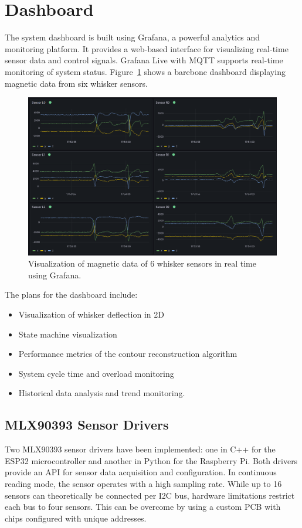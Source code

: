 \section{Dashboard}
The system dashboard is built using Grafana, a powerful analytics and monitoring platform.
It provides a web-based interface for visualizing real-time sensor data and control signals.
Grafana Live with MQTT supports real-time monitoring of system status.
Figure~\ref{fig:grafana} shows a barebone dashboard displaying magnetic data from six whisker sensors.


\begin{figure}[htb]
    \centering
    \includegraphics[width=\textwidth]{figures/grafana}
    \caption{Visualization of magnetic data of 6 whisker sensors in real time using Grafana.}
    \label{fig:grafana}
\end{figure}

The plans for the dashboard include:
\begin{itemize}
    \item Visualization of whisker deflection in 2D
    \item State machine visualization
    \item Performance metrics of the contour reconstruction algorithm
    \item System cycle time and overload monitoring
    \item Historical data analysis and trend monitoring.
\end{itemize}

\subsection{MLX90393 Sensor Drivers}
Two MLX90393 sensor drivers have been implemented: one in C++ for the ESP32 microcontroller and another in Python for the Raspberry Pi.
Both drivers provide an API for sensor data acquisition and configuration.
In continuous reading mode, the sensor operates with a high sampling rate.
While up to 16 sensors can theoretically be connected per I2C bus, hardware limitations restrict each bus to four sensors.
This can be overcome by using a custom PCB with chips configured with unique addresses.
